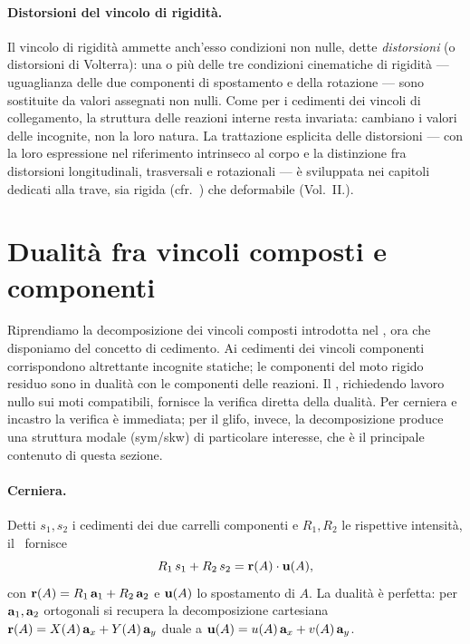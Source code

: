 \paragraph{Distorsioni del vincolo di rigidità.}
Il vincolo di rigidità ammette anch'esso condizioni
non nulle, dette \emph{distorsioni} (o distorsioni di
Volterra): una o più delle tre condizioni cinematiche
di rigidità --- uguaglianza delle due componenti di
spostamento e della rotazione --- sono sostituite da
valori assegnati non nulli. Come per i cedimenti dei
vincoli di collegamento, la struttura delle reazioni
interne resta invariata: cambiano i valori delle
incognite, non la loro natura.
La trattazione esplicita delle distorsioni --- con la
loro espressione nel riferimento intrinseco al corpo e
la distinzione fra distorsioni longitudinali, trasversali
e rotazionali --- è sviluppata nei capitoli dedicati
alla trave, sia rigida (cfr.~) che deformabile (Vol.~II.).


\section{Dualità fra vincoli composti e componenti}
\label{sec:dualita_composti}

Riprendiamo la decomposizione dei vincoli composti
introdotta nel , ora che
disponiamo del concetto di cedimento. Ai cedimenti dei
vincoli componenti corrispondono altrettante incognite
statiche; le componenti del moto rigido residuo sono in
dualità con le componenti delle reazioni. Il \PLV,
richiedendo lavoro nullo sui moti compatibili, fornisce
la verifica diretta della dualità. Per cerniera e incastro
la verifica è immediata; per il glifo, invece, la
decomposizione produce una struttura modale (sym/skw) di
particolare interesse, che è il principale contenuto di
questa sezione.

\paragraph{Cerniera.}
Detti $s_1, s_2$ i cedimenti dei due carrelli componenti e
$R_1, R_2$ le rispettive intensità, il \PLV\ fornisce
\begin{equation}
	R_1\,s_1 + R_2\,s_2 = \mathbf{r}(A) \cdot \mathbf{u}(A),
\end{equation}
con $\mathbf{r}(A) = R_1\,\mathbf{a}_1 + R_2\,\mathbf{a}_2$ e $\mathbf{u}(A)$ lo
spostamento di $A$. La dualità è perfetta: per
$\mathbf{a}_1, \mathbf{a}_2$ ortogonali si recupera la decomposizione
cartesiana $\mathbf{r}(A) = X(A)\,\mathbf{a}_x + Y(A)\,\mathbf{a}_y$ duale a
$\mathbf{u}(A) = u(A)\,\mathbf{a}_x + v(A)\,\mathbf{a}_y$.


